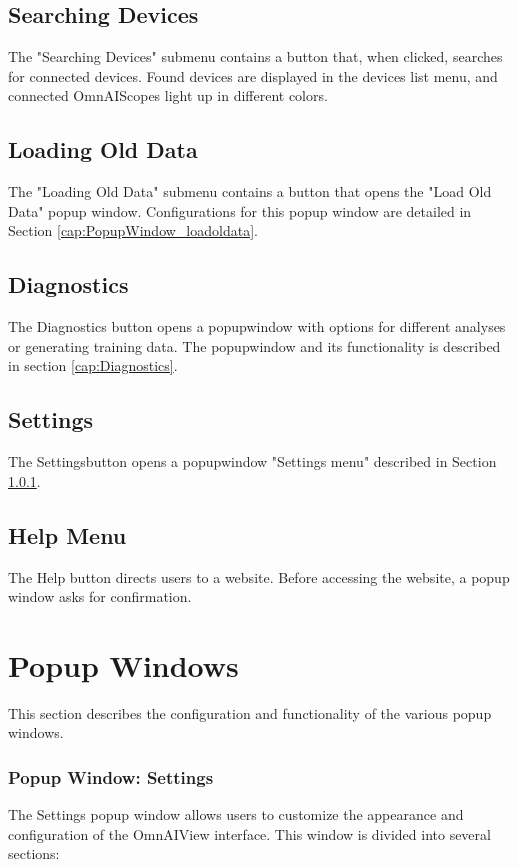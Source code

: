 \documentclass[]{scrreprt}
\begin{document}
\subsection{Searching Devices}
The "Searching Devices" submenu contains a button that, when clicked, searches for connected devices. Found devices are displayed in the devices list menu, and connected OmnAIScopes light up in
different colors.

\subsection{Loading Old Data}
The "Loading Old Data" submenu contains a button that opens the "Load Old Data" popup window. Configurations for this popup window are detailed in Section \ref{cap:PopupWindow_loadoldata}.

\subsection{Diagnostics}
The Diagnostics button opens a popupwindow with options for different analyses or generating training data. The popupwindow and its functionality is described in section \ref{cap:Diagnostics}.

\subsection{Settings}
The Settingsbutton opens a popupwindow "Settings menu" described in Section \ref{cap:PopupWindow_settings}.

\subsection{Help Menu}
The Help button directs users to a website. Before accessing the website, a popup window asks for confirmation.

\section{Popup Windows}

This section describes the configuration and functionality of the various popup windows.

\subsubsection{Popup Window: Settings} \label{cap:PopupWindow_settings}

The Settings popup window allows users to customize the appearance and configuration of the OmnAIView interface. This window is divided into several sections:
\end{document}
